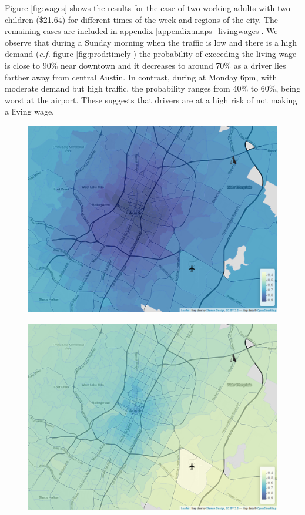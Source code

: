 \documentclass[11pt]{article}
\begin{document}
Figure \ref{fig:wages} shows the results for the case of two working adults with two children (\$21.64) for different times of the week and regions of the city. The remaining cases are included in appendix \ref{appendix:maps_livingwages}. We observe that during a Sunday morning when the traffic is low and there is a high demand (\textit{c.f.} figure \ref{fig:prod:timely}) the probability of exceeding the living wage is close to 90\% near downtown and it decreases to around 70\% as a driver lies farther away from central Austin. In contrast, during at Monday 6pm, with moderate demand but high traffic, the probability ranges from 40\% to 60\%, being worst at the airport. These suggests that drivers are at a high risk of not making a living wage.

\begin{figure}[htb]
    \centering
    \begin{minipage}[t]{0.48\linewidth}
        \centering
        \includegraphics[width=\linewidth]{img/tailprob_21_64__9.png}
        \label{fig:wages:a}
    \end{minipage}
    \begin{minipage}[t]{0.48\linewidth}
        \centering
        \includegraphics[width=\linewidth]{img/tailprob_21_64__43.png}

\end{minipage}
\end{figure}
\end{document}
